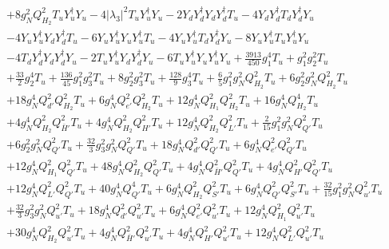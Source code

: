 {\begin{align}
 &+8 g_{N}^{2} Q_{H_2}^{2} {T_u  Y_{u}^{\dagger}  Y_u} -4 |\lambda_3|^2 {T_u  Y_{u}^{\dagger}  Y_u} -2 {Y_d  Y_{d}^{\dagger}  Y_d  Y_{d}^{\dagger}  T_u} -4 {Y_d  Y_{d}^{\dagger}  T_d  Y_{d}^{\dagger}  Y_u} \nonumber \\ 
 &-4 {Y_u  Y_{u}^{\dagger}  Y_d  Y_{d}^{\dagger}  T_u} -6 {Y_u  Y_{u}^{\dagger}  Y_u  Y_{u}^{\dagger}  T_u} -4 {Y_u  Y_{u}^{\dagger}  T_d  Y_{d}^{\dagger}  Y_u} -8 {Y_u  Y_{u}^{\dagger}  T_u  Y_{u}^{\dagger}  Y_u} \nonumber \\ 
 &-4 {T_d  Y_{d}^{\dagger}  Y_d  Y_{d}^{\dagger}  Y_u} -2 {T_u  Y_{u}^{\dagger}  Y_d  Y_{d}^{\dagger}  Y_u} -6 {T_u  Y_{u}^{\dagger}  Y_u  Y_{u}^{\dagger}  Y_u} +\frac{3913}{450} g_{1}^{4} T_u +g_{1}^{2} g_{2}^{2} T_u \nonumber \\ 
 &+\frac{33}{2} g_{2}^{4} T_u +\frac{136}{45} g_{1}^{2} g_{3}^{2} T_u +8 g_{2}^{2} g_{3}^{2} T_u +\frac{128}{9} g_{3}^{4} T_u +\frac{6}{5} g_{1}^{2} g_{N}^{2} Q_{H_2}^{2} T_u +6 g_{2}^{2} g_{N}^{2} Q_{H_2}^{2} T_u \nonumber \\ 
 &+18 g_{N}^{4} Q_{d'}^{2} Q_{H_2}^{2} T_u +6 g_{N}^{4} Q_{e'}^{2} Q_{H_2}^{2} T_u +12 g_{N}^{4} Q_{H_1}^{2} Q_{H_2}^{2} T_u +16 g_{N}^{4} Q_{H_2}^{4} T_u \nonumber \\ 
 &+4 g_{N}^{4} Q_{H_2}^{2} Q_{\bar{H}'}^{2} T_u +4 g_{N}^{4} Q_{H_2}^{2} Q_{H'}^{2} T_u +12 g_{N}^{4} Q_{H_2}^{2} Q_{L'}^{2} T_u +\frac{2}{15} g_{1}^{2} g_{N}^{2} Q_{Q'}^{2} T_u \nonumber \\ 
 &+6 g_{2}^{2} g_{N}^{2} Q_{Q'}^{2} T_u +\frac{32}{3} g_{3}^{2} g_{N}^{2} Q_{Q'}^{2} T_u +18 g_{N}^{4} Q_{d'}^{2} Q_{Q'}^{2} T_u +6 g_{N}^{4} Q_{e'}^{2} Q_{Q'}^{2} T_u \nonumber \\ 
 &+12 g_{N}^{4} Q_{H_1}^{2} Q_{Q'}^{2} T_u +48 g_{N}^{4} Q_{H_2}^{2} Q_{Q'}^{2} T_u +4 g_{N}^{4} Q_{\bar{H}'}^{2} Q_{Q'}^{2} T_u +4 g_{N}^{4} Q_{H'}^{2} Q_{Q'}^{2} T_u \nonumber \\ 
 &+12 g_{N}^{4} Q_{L'}^{2} Q_{Q'}^{2} T_u +40 g_{N}^{4} Q_{Q'}^{4} T_u +6 g_{N}^{4} Q_{H_2}^{2} Q_{S'}^{2} T_u +6 g_{N}^{4} Q_{Q'}^{2} Q_{S'}^{2} T_u +\frac{32}{15} g_{1}^{2} g_{N}^{2} Q_{u'}^{2} T_u \nonumber \\ 
 &+\frac{32}{3} g_{3}^{2} g_{N}^{2} Q_{u'}^{2} T_u +18 g_{N}^{4} Q_{d'}^{2} Q_{u'}^{2} T_u +6 g_{N}^{4} Q_{e'}^{2} Q_{u'}^{2} T_u +12 g_{N}^{4} Q_{H_1}^{2} Q_{u'}^{2} T_u \nonumber \\ 
 &+30 g_{N}^{4} Q_{H_2}^{2} Q_{u'}^{2} T_u +4 g_{N}^{4} Q_{\bar{H}'}^{2} Q_{u'}^{2} T_u +4 g_{N}^{4} Q_{H'}^{2} Q_{u'}^{2} T_u +12 g_{N}^{4} Q_{L'}^{2} Q_{u'}^{2} T_u \nonumber \\ 

\end{align}}
